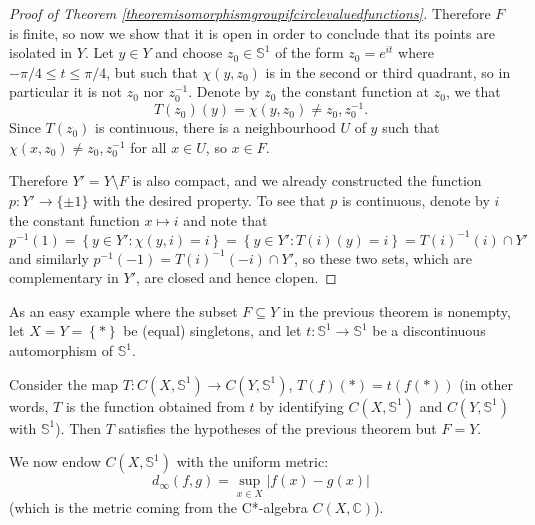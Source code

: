 \begin{proof}[Proof of Theorem \ref{theoremisomorphismgroupifcirclevaluedfunctions}]
Therefore $F$ is finite, so now we show that it is open in order to conclude that its points are isolated in $Y$. Let $y\in Y$ and choose $z_0\in\mathbb{S}^1$ of the form $z_0=e^{it}$ where $-\pi/4\leq t\leq \pi/4$, but such that $\chi(y,z_0)$ is in the second or third quadrant, so in particular it is not $z_0$ nor $z_0^{-1}$. Denote by $z_0$ the constant function at $z_0$, we that
\[T(z_0)(y)=\chi(y,z_0)\neq z_0,z_0^{-1}.\]
Since $T(z_0)$ is continuous, there is a neighbourhood $U$ of $y$ such that $\chi(x,z_0)\neq z_0,z_0^{-1}$ for all $x\in U$, so $x\in F$.

Therefore $Y'=Y\setminus F$ is also compact, and we already constructed the function $p:Y'\to\{\pm 1\}$ with the desired property. To see that $p$ is continuous, denote by $i$ the constant function $x\mapsto i$ and note that
\[p^{-1}(1)=\left\{y\in Y':\chi(y,i)=i\right\}=\left\{y\in Y':T(i)(y)=i\right\}=T(i)^{-1}(i)\cap Y'\]
and similarly $p^{-1}(-1)=T(i)^{-1}(-i)\cap Y'$, so these two sets, which are complementary in $Y'$, are closed and hence clopen.\qedhere
\end{proof}

\begin{example}
As an easy example where the subset $F\subseteq Y$ in the previous theorem is nonempty, let $X=Y=\left\{\ast\right\}$ be (equal) singletons, and let $t:\mathbb{S}^1\to\mathbb{S}^1$ be a discontinuous automorphism of $\mathbb{S}^1$.

Consider the map $T:C(X,\mathbb{S}^1)\to C(Y,\mathbb{S}^1)$, $T(f)(\ast)=t(f(\ast))$ (in other words, $T$ is the function obtained from $t$ by identifying $C(X,\mathbb{S}^1)$ and $C(Y,\mathbb{S}^1)$ with $\mathbb{S}^1$). Then $T$ satisfies the hypotheses of the previous theorem but $F=Y$.
\end{example}

We now endow $C(X,\mathbb{S}^1)$ with the uniform metric:
\[d_\infty(f,g)=\sup_{x\in X}|f(x)-g(x)|\]
(which is the metric coming from the C*-algebra $C(X,\mathbb{C})$).

